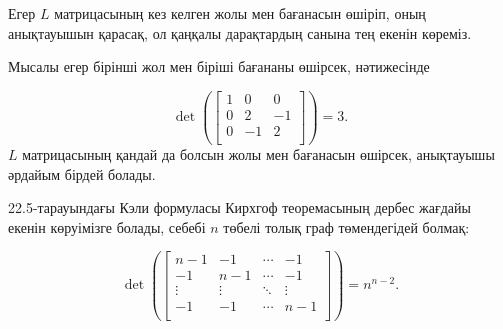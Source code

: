 Егер $L$ матрицасының кез келген жолы мен
бағанасын өшіріп, оның анықтауышын қарасақ,
ол қаңқалы дарақтардың санына тең екенін
көреміз. 

Мысалы егер бірінші жол мен біріші бағананы 
өшірсек, нәтижесінде

\[ \det(
\begin{bmatrix}
  1 & 0 & 0 \\
  0 & 2 & -1 \\
  0 & -1 & 2 \\
 \end{bmatrix}
) =3.\]
$L$ матрицасының қандай да болсын жолы мен 
бағанасын өшірсек, анықтауышы әрдайым бірдей 
болады.

22.5-тарауындағы Кэли формуласы 
Кирхгоф теоремасының дербес жағдайы
екенін көруімізге болады,
себебі $n$ төбелі толық граф төмендегідей болмақ: 

\[ \det(
\begin{bmatrix}
  n-1 & -1 & \cdots & -1 \\
  -1 & n-1 & \cdots & -1 \\
  \vdots & \vdots & \ddots & \vdots \\
  -1 & -1 & \cdots & n-1 \\
 \end{bmatrix}
) =n^{n-2}.\]



